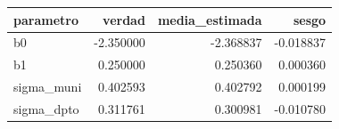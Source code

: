 \begin{tabular}{lrrr}
\toprule
parametro & verdad & media\_estimada & sesgo \\
\midrule
b0 & -2.350000 & -2.368837 & -0.018837 \\
b1 & 0.250000 & 0.250360 & 0.000360 \\
sigma\_muni & 0.402593 & 0.402792 & 0.000199 \\
sigma\_dpto & 0.311761 & 0.300981 & -0.010780 \\
\bottomrule
\end{tabular}
